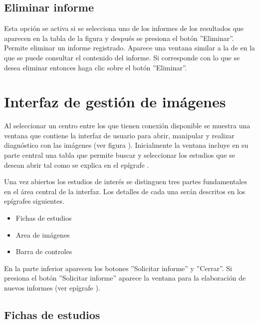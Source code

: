 \documentclass{plantilla-manual-usuario}
\begin{document}
\subsection{Eliminar informe}\label{subsectionEliminarInforme}
Esta opción se activa si se selecciona uno de los informes de los resultados que aparecen en la tabla de la figura  y después se presiona el botón ”Eliminar”. Permite eliminar un informe registrado. Aparece una ventana similar a la de  en la que se puede consultar el contenido del informe.  Si corresponde con lo que se desea eliminar entonces haga clic sobre el botón ”Eliminar”.


\section{Interfaz de gestión de imágenes}\label{sectionInterfazdeImagenes}

Al seleccionar un centro entre los que tienen conexión disponible se muestra una ventana que contiene la interfaz de usuario para abrir, manipular y realizar diagnóstico con las imágenes (ver figura ). Inicialmente la ventana incluye en su parte central una tabla que permite buscar y seleccionar los estudios que se desean abrir tal como se explica en el epígrafe .

Una vez abiertos los estudios de interés se distinguen tres partes fundamentales en el área central de la interfaz. Los detalles de cada una serán descritos en los epígrafes siguientes.

\begin{itemize}
\item Fichas de estudios
\item Area de imágenes
\item Barra de controles
\end{itemize}


En la parte inferior aparecen los botones ”Solicitar informe” y ”Cerrar”. Si presiona el botón ”Solicitar informe” aparece la ventana para la elaboración de nuevos informes (ver epígrafe ).


\subsection{Fichas de estudios}\label{sectionFichadeEstudios}
\end{document}
